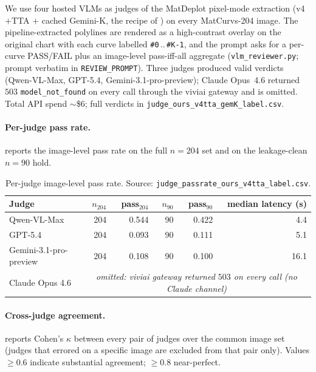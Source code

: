 \documentclass{article}
\begin{document}
We use four hosted VLMs as judges of the MatDeplot pixel-mode
extraction (v4$+$TTA $+$ cached Gemini-K, the recipe of
) on every MatCurvs-204 image. The
pipeline-extracted polylines are rendered as a high-contrast
overlay on the original chart with each curve labelled
\texttt{\#0}\,..\,\texttt{\#K{-}1}, and the prompt asks for a
per-curve PASS/FAIL plus an image-level pass-iff-all aggregate
(\texttt{vlm\_reviewer.py}; prompt verbatim in
\texttt{REVIEW\_PROMPT}). Three judges produced valid verdicts
(Qwen-VL-Max, GPT-5.4, Gemini-3.1-pro-preview); Claude Opus~4.6
returned $503$ \texttt{model\_not\_found} on every call through
the viviai gateway and is omitted. Total API spend $\sim$\$6;
full verdicts in \texttt{judge\_ours\_v4tta\_gemK\_label.csv}.

\paragraph{Per-judge pass rate.}
 reports the image-level pass rate on the
full $n{=}204$ set and on the leakage-clean $n{=}90$ hold.

\begin{table}[h]
\centering
\caption{Per-judge image-level pass rate. Source:
\texttt{judge\_passrate\_ours\_v4tta\_label.csv}.}
\label{tab:judge-passrate}
\small
\begin{tabular}{lrrrrr}
\toprule
Judge & $n_{204}$ & pass$_{204}$ & $n_{90}$ & pass$_{90}$ & median latency (s) \\
\midrule
Qwen-VL-Max                 & 204 & 0.544 &  90 & 0.422 &   4.4 \\
GPT-5.4                     & 204 & 0.093 &  90 & 0.111 &   5.1 \\
Gemini-3.1-pro-preview      & 204 & 0.108 &  90 & 0.100 &  16.1 \\
Claude Opus 4.6             & \multicolumn{5}{c}{\emph{omitted: viviai gateway returned $503$ on every call (no Claude channel)}} \\
\bottomrule
\end{tabular}
\end{table}

\paragraph{Cross-judge agreement.}
 reports Cohen's $\kappa$ between every pair
of judges over the common image set (judges that errored on a
specific image are excluded from that pair only). Values $\geq 0.6$
indicate substantial agreement; $\geq 0.8$ near-perfect.
\end{document}
